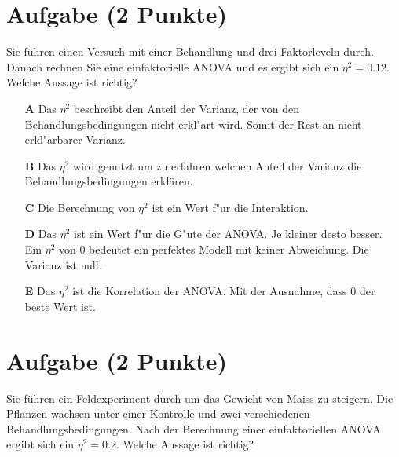 \documentclass[a4paper, 9pt]{scrartcl}\usepackage[]{graphicx}\usepackage[]{xcolor}
\begin{document}
\section{Aufgabe \hfill (2 Punkte)}





Sie führen einen Versuch mit einer Behandlung und drei Faktorleveln durch. Danach rechnen Sie eine einfaktorielle ANOVA und es ergibt sich ein $\eta^2 = 0.12$. Welche Aussage ist richtig?



\begin{enumerate}
\item [\textbf{A} \msquare] Das $\eta^2$ beschreibt den Anteil der Varianz, der von den Behandlungsbedingungen nicht erkl{"a}rt wird. Somit der Rest an nicht erkl{"a}rbarer Varianz.
\item [\textbf{B} \msquare] Das $\eta^2$ wird genutzt um zu erfahren welchen Anteil der Varianz die Behandlungsbedingungen erklären.
\item [\textbf{C} \msquare] Die Berechnung von $\eta^2$ ist ein Wert f{"u}r die Interaktion.
\item [\textbf{D} \msquare] Das $\eta^2$ ist ein Wert f{"u}r die G{"u}te der ANOVA. Je kleiner desto besser. Ein $\eta^2$ von 0 bedeutet ein perfektes Modell mit keiner Abweichung. Die Varianz ist null.
\item [\textbf{E} \msquare] Das $\eta^2$ ist die Korrelation der ANOVA. Mit der Ausnahme, dass 0 der beste Wert ist.
\end{enumerate} 

\section{Aufgabe \hfill (2 Punkte)}



Sie führen ein Feldexperiment durch um das Gewicht von Maiss zu
steigern. Die Pflanzen wachsen unter einer Kontrolle und zwei verschiedenen
Behandlungsbedingungen. Nach der Berechnung einer einfaktoriellen ANOVA
ergibt sich ein $\eta^2 = 0.2$. Welche Aussage ist richtig?
\end{document}
